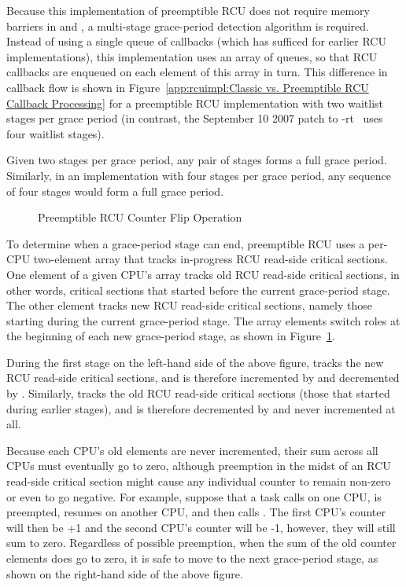 Because this implementation of preemptible RCU does not require memory
barriers in  and ,
a multi-stage grace-period detection algorithm is required.
Instead of using a single  queue of callbacks
(which has sufficed for earlier RCU implementations), this implementation
uses an array of  queues, so that RCU callbacks
are enqueued on each element of this array in turn.
This difference in callback flow is shown in
Figure~\ref{app:rcuimpl:Classic vs. Preemptible RCU Callback Processing}
for a preemptible RCU implementation with two waitlist stages per grace period
(in contrast,
the September 10 2007 patch to -rt~\cite{PaulEMcKenney2007PreemptibleRCUPatch}
uses four waitlist stages).

Given two stages per grace period, any pair of
stages forms a full grace period.
Similarly, in an implementation with four stages per grace period,
any sequence of four stages would form a full grace period.

\begin{figure}[htb]
\centering
{}
\caption{Preemptible RCU Counter Flip Operation}
\label{app:rcuimpl:Preemptible RCU Counter Flip Operation}
\end{figure}

To determine when a grace-period stage can end,
preemptible RCU uses a per-CPU two-element  array
that tracks in-progress RCU read-side critical sections.
One element of a given CPU's  array tracks
old RCU read-side critical sections, in other words, critical sections
that started before the current grace-period stage.
The other element tracks new RCU read-side critical
sections, namely those starting during the current grace-period stage.
The array elements switch roles at the beginning of each new grace-period
stage, as shown in
Figure~\ref{app:rcuimpl:Preemptible RCU Counter Flip Operation}.

During the first stage on the left-hand side of the above figure,
 tracks the new
RCU read-side critical sections, and is therefore incremented by
 and decremented by .
Similarly,  tracks the old RCU read-side
critical sections (those that started during earlier stages), and
is therefore decremented by  and never
incremented at all.

Because each CPU's old  elements are never
incremented, their sum across all CPUs must eventually go to zero,
although preemption in the midst of an RCU read-side critical section might
cause any individual counter to remain non-zero or even to go negative.
For example, suppose that a task calls  on
one CPU, is preempted, resumes on another CPU, and then calls
.
The first CPU's counter will then be +1 and the second CPU's counter
will be -1, however, they will still sum to zero.
Regardless of possible preemption, when the sum of the old counter
elements does go to zero, it is safe to move to the next grace-period
stage, as shown on the right-hand side of the above figure.


